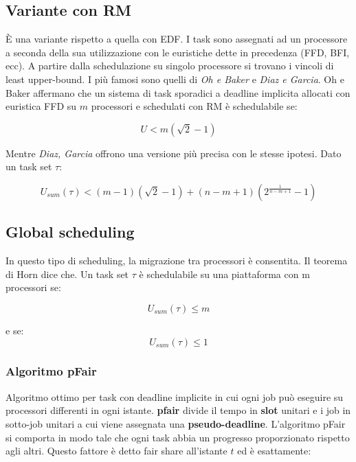 \documentclass[11pt,a4paper]{report}
\begin{document}
\subsection{Variante con RM}
È una variante rispetto a quella con EDF. I task sono assegnati ad un processore a seconda della sua utilizzazione con le euristiche dette in precedenza (FFD, BFI, ecc). A partire dalla schedulazione su singolo processore si trovano i vincoli di least upper-bound. I più famosi sono quelli di \textit{Oh e Baker} e \textit{Diaz e Garcia}. Oh e Baker affermano che un sistema di task sporadici a deadline implicita allocati con euristica FFD su $m$ processori e schedulati con RM è schedulabile se:

\begin{equation}
    U < m (\sqrt{2} - 1)
\end{equation}

Mentre \textit{Diaz, Garcia} offrono una versione più precisa con le stesse ipotesi. Dato un task set $\tau$:

\begin{equation}
    U_{sum}(\tau) < (m-1)(\sqrt{2} - 1) +  (n - m +1)(2^{\frac{1}{n-m+1}} - 1)
\end{equation}


\subsection{Global scheduling}
In questo tipo di scheduling, la migrazione tra processori è consentita. Il teorema di Horn dice che. Un task set $\tau$ è schedulabile su una piattaforma con m processori se:

\begin{equation}
    U_{sum}(\tau) \leq m
\end{equation}

e se:
\begin{equation}
    U_{sum}(\tau) \leq 1
\end{equation}

\subsubsection{Algoritmo pFair}
Algoritmo ottimo per task con deadline implicite in cui ogni job può eseguire su processori differenti in ogni istante. \textbf{pfair} divide il tempo in \textbf{slot} unitari e i job in sotto-job unitari a cui viene assegnata una \textbf{pseudo-deadline}. L'algoritmo pFair si comporta in modo tale che ogni task abbia un progresso proporzionato rispetto agli altri. Questo
fattore è detto fair share all'istante $t$ ed è esattamente:
\end{document}
